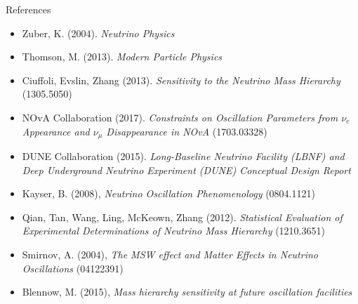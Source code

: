 \documentclass{beamer}
\begin{document}
\begin{frame}{References}

	\scriptsize{
	\begin{itemize}
		\item Zuber, K. (2004). \emph{Neutrino Physics}
		\item Thomson, M. (2013). \emph{Modern Particle Physics}
		\item Ciuffoli, Evslin, Zhang (2013). \emph{Sensitivity to the Neutrino
			Mass Hierarchy}
			(1305.5050)
		\item NOvA Collaboration (2017). \emph{Constraints on Oscillation Parameters from
			$\nu_e$ Appearance and $\nu_\mu$ Disappearance in NOvA} (1703.03328)
		\item DUNE Collaboration (2015). \emph{Long-Baseline Neutrino Facility (LBNF) and
			Deep Underground Neutrino Experiment (DUNE) Conceptual Design Report}
		\item Kayser, B. (2008), \emph{Neutrino Oscillation Phenomenology} (0804.1121)
		\item Qian, Tan, Wang, Ling, McKeown, Zhang (2012). \emph{Statistical Evaluation of
			Experimental Determinations of Neutrino Mass Hierarchy} (1210.3651)
		\item Smirnov, A. (2004), \emph{The MSW effect and Matter Effects in Neutrino
			Oscillations} (04122391)
		\item Blennow, M. (2015), \emph{Mass hierarchy sensitivity at future
			oscillation facilities}
	\end{itemize}}

\end{frame}
\end{document}
